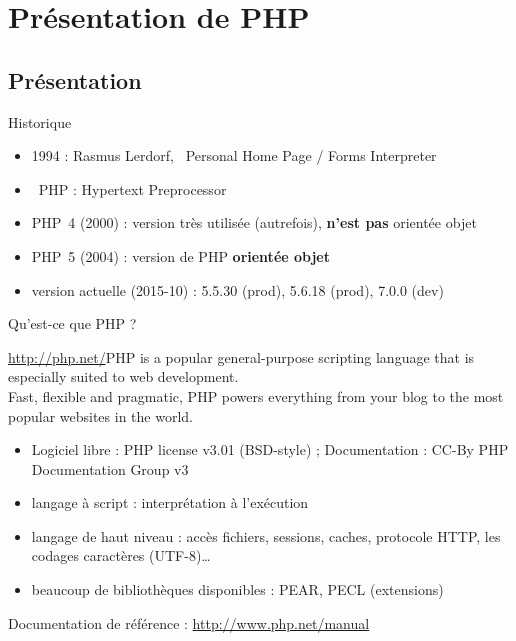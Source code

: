 
\section{Présentation de PHP}

\subsection{Présentation}

\begin{frame}{Historique}
    \begin{itemize}
	    \item 1994 : Rasmus Lerdorf, \og~Personal Home Page / Forms Interpreter~\fg
    	\item \og~PHP : Hypertext Preprocessor~\fg 
    	\item PHP~4 (2000) : version très utilisée (autrefois), \textbf{n’est pas} orientée objet
    	\item PHP~5 (2004) : version de PHP \textbf{orientée objet}
    	\item version actuelle (2015-10) : 5.5.30 (prod), 5.6.18 (prod), 7.0.0 (dev)
    \end{itemize}
\end{frame}

\begin{frame}{Qu'est-ce que PHP ?}
    \begin{block}{\url{http://php.net/}}PHP is a popular general-purpose scripting language that is especially suited to web development.\\Fast, flexible and pragmatic, PHP powers everything from your blog to the most popular websites in the world.
    \end{block}
    \begin{itemize}
        \item Logiciel libre : PHP license v3.01 (BSD-style) ; Documentation : CC-By PHP Documentation Group v3
        \item langage à script : interprétation à l’exécution
        \item langage de haut niveau : accès fichiers, sessions, caches, protocole HTTP, les codages caractères (UTF-8)\ldots
        \item beaucoup de bibliothèques disponibles : PEAR, PECL (extensions)
    \end{itemize}
    Documentation de référence : \url{http://www.php.net/manual}
\end{frame}

